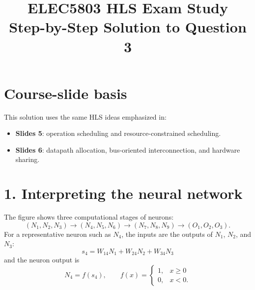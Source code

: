\documentclass[11pt,a4paper]{article}
\title{ELEC5803 HLS Exam Study\\Step-by-Step Solution to Question 3}
\author{}
\date{}
\begin{document}
\maketitle

\section*{Course-slide basis}
This solution uses the same HLS ideas emphasized in:
\begin{itemize}
  \item \textbf{Slides 5}: operation scheduling and resource-constrained scheduling.
  \item \textbf{Slides 6}: datapath allocation, bus-oriented interconnection, and hardware sharing.
\end{itemize}

\section*{1. Interpreting the neural network}
The figure shows three computational stages of neurons:
\[
(N_1,N_2,N_3)\rightarrow (N_4,N_5,N_6)\rightarrow (N_7,N_8,N_9)\rightarrow (O_1,O_2,O_3).
\]
For a representative neuron such as $N_4$, the inputs are the outputs of $N_1$, $N_2$, and $N_3$:
\[
s_4 = W_{14}N_1 + W_{24}N_2 + W_{34}N_3
\]
and the neuron output is
\[
N_4=f(s_4),\qquad
f(x)=
\begin{cases}
1,&x\ge 0\\
0,&x<0.
\end{cases}
\]
\end{document}
